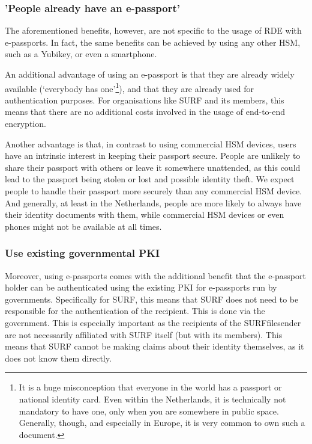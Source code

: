 \subsubsection{'People already have an e-passport'}\label{subsubsec:people-already-have-an-e-passport}
The aforementioned benefits, however, are not specific to the usage of RDE with e-passports.
In fact, the same benefits can be achieved by using any other HSM, such as a Yubikey, or even a smartphone.

An additional advantage of using an e-passport is that they are already widely available (`everybody has one'\footnote{
    It is a huge misconception that everyone in the world has a passport or national identity card.
    Even within the Netherlands, it is technically not mandatory to have one, only when you are somewhere in public space.
    Generally, though, and especially in Europe, it is very common to own such a document.}),
and that they are already used for authentication purposes.
For organisations like SURF and its members, this means that there are no additional costs involved in the usage of end-to-end encryption.

Another advantage is that, in contrast to using commercial HSM devices, users have an intrinsic interest in keeping their passport secure.
People are unlikely to share their passport with others or leave it somewhere unattended, as this could lead to the passport being stolen or lost and possible identity theft.
We expect people to handle their passport more securely than any commercial HSM device.
And generally, at least in the Netherlands, people are more likely to always have their identity documents with them, while commercial HSM devices or even phones might not be available at all times.

\subsubsection{Use existing governmental PKI}\label{subsubsec:use-existing-governmental-pki}
Moreover, using e-passports comes with the additional benefit that the e-passport holder can be authenticated using the existing PKI for e-passports run by governments.
Specifically for SURF, this means that SURF does not need to be responsible for the authentication of the recipient.
This is done via the government.
This is especially important as the recipients of the SURFfilesender are not necessarily affiliated with SURF itself (but with its members).
This means that SURF cannot be making claims about their identity themselves, as it does not know them directly.
